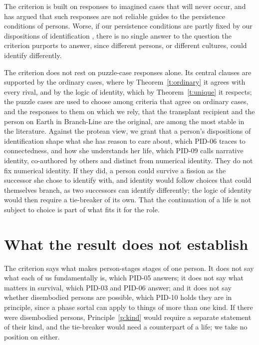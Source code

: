 \documentclass{situationist-preprint}
\begin{document}
\begin{objection}\label{o:method}
The criterion is built on responses to imagined cases that will never occur, and \citet{Johnston1987} has argued that such responses are not reliable guides to the persistence conditions of persons. Worse, if our persistence conditions are partly fixed by our dispositions of identification \citep{Johnston2010}, there is no single answer to the question the criterion purports to answer, since different persons, or different cultures, could identify differently.
\end{objection}

\begin{reply}
The criterion does not rest on puzzle-case responses alone. Its central clauses are supported by the ordinary cases, where by Theorem~\ref{t:ordinary} it agrees with every rival, and by the logic of identity, which by Theorem~\ref{t:unique} it respects; the puzzle cases are used to choose among criteria that agree on ordinary cases, and the responses to them on which we rely, that the transplant recipient and the person on Earth in Branch-Line are the original, are among the most stable in the literature. Against the protean view, we grant that a person's dispositions of identification shape what she has reason to care about, which PID-06 traces to connectedness, and how she understands her life, which PID-09 calls narrative identity, co-authored by others and distinct from numerical identity. They do not fix numerical identity. If they did, a person could survive a fission as the successor she chose to identify with, and identity would follow choices that could themselves branch, as two successors can identify differently; the logic of identity would then require a tie-breaker of its own. That the continuation of a life is not subject to choice is part of what fits it for the role.
\end{reply}

\section{What the result does not establish}\label{s:limits}

The criterion says what makes person-stages stages of one person. It does not say what each of us fundamentally is, which PID-05 answers; it does not say what matters in survival, which PID-03 and PID-06 answer; and it does not say whether disembodied persons are possible, which PID-10 holds they are in principle, since a phase sortal can apply to things of more than one kind. If there were disembodied persons, Principle~\ref{p:kind} would require a separate statement of their kind, and the tie-breaker would need a counterpart of a life; we take no position on either.
\end{document}
